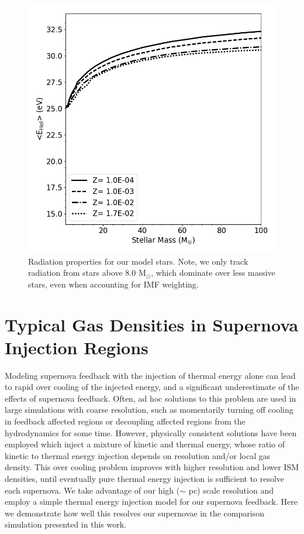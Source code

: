 \documentclass[twocolumn]{aastex61}
\newcommand{\msun}{M$_{\odot}$}
\begin{document}
\begin{figure}
\includegraphics[width=0.4\linewidth]{E1}
\caption{Radiation properties for our model stars. Note, we only track radiation from stars above
8.0 \msun, which dominate over less massive stars, even when accounting for IMF weighting.}
\label{fig:stellar radiation properties}
\end{figure}

\section{Typical Gas Densities in Supernova Injection Regions}
\label{appendix:supernova}

Modeling supernova feedback with the injection of thermal energy alone can lead to rapid over cooling of the injected energy, and a significant underestimate of the effects of supernova feedback. Often, ad hoc solutions to this problem are used in large simulations with coarse resolution, such as momentarily turning off cooling in feedback affected regions or decoupling affected regions from the hydrodynamics for some time. However, physically consistent solutions have been employed \citep[e.g][]{Simpson2016} which inject a mixture of kinetic and thermal energy, whose ratio of kinetic to thermal energy injection depends on resolution and/or local gas density. This over cooling problem improves with higher resolution and lower ISM densities, until eventually pure thermal energy injection is sufficient to resolve each supernova. We take advantage of our high ($\sim$ pc) scale resolution and employ a simple thermal energy injection model for our supernova feedback. Here we demonstrate how well this resolves our supernovae in the comparison simulation presented in this work.
\end{document}
